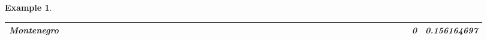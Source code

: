 \documentclass[a4paper,11pt]{report}
\newtheorem{example}[theorem]{Example}
\begin{document}
\begin{example}
\begin{appendices}
\begin{landscape}
\begin{longtable}{r|r|r|r|r|r|r|r|r|r|r|r|r|r|r|r|r|r|r|r|r|r|r|r|r|r|r|r|r|r|r|r|r|r|r|r|r|r|r|r|r|r|r|r|}
\multicolumn{1}{|r|}{\textbf{Montenegro}}      &                                       &                                       &                                       &                                          &                                       &                                       &                                        &                                       &                                      &                                       &                                       &                                                &                                       &                                      &                                       &                                       &                                      &                                       &                                       &                                       &                                      &                                     &                                      &                                         &                                     &                                       &                                          &                                      &                                       &                                      &                                          &                                      &                                        &                                     &                                      &                                           &                                               &                                       &                                              &                                      &                                     & 0                                             & 0.156164697                             \\ \hline

\end{longtable}
\end{landscape}
\end{appendices}
\end{example}
\end{document}
